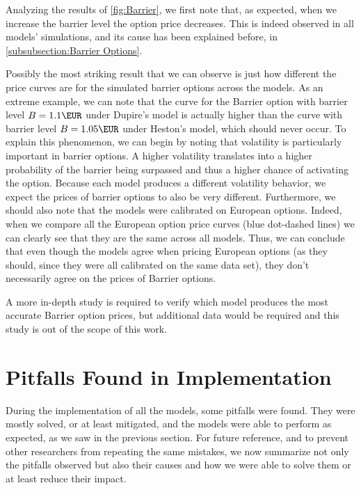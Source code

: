 \vfill
\newpage

Analyzing the results of \autoref{fig:Barrier}, we first note that, as expected, when we increase the barrier level the option price decreases. This is indeed observed in all models' simulations, and its cause has been explained before, in \autoref{subsubsection:Barrier Options}.

Possibly the most striking result that we can observe is just how different the price curves are for the simulated barrier options across the models. As an extreme example, we can note that the curve for the Barrier option with barrier level $B=1.1\EUR$ under Dupire's model is actually higher than the curve with barrier level $B=1.05\EUR$ under Heston's model, which should never occur. To explain this phenomenon, we can begin by noting that volatility is particularly important in barrier options. A higher volatility translates into a higher probability of the barrier being surpassed and thus a higher chance of activating the option.
Because each model produces a different volatility behavior, we expect the prices of barrier options to also be very different. Furthermore, we should also note that the models were calibrated on European options. Indeed, when we compare all the European option price curves (blue dot-dashed lines) we can clearly see that they are the same across all models. Thus, we can conclude that even though the models agree when pricing European options (as they should, since they were all calibrated on the same data set), they don't necessarily agree on the prices of Barrier options.

A more in-depth study is required to verify which model produces the most accurate Barrier option prices, but additional data would be required and this study is out of the scope of this work.

\vfill
\newpage

\section{Pitfalls Found in Implementation}
During the implementation of all the models, some pitfalls were found. They were mostly solved, or at least mitigated, and the models were able to perform as expected, as we saw in the previous section. For future reference, and to prevent other researchers from repeating the same mistakes, we now summarize not only the pitfalls observed but also their causes and how we were able to solve them or at least reduce their impact.

